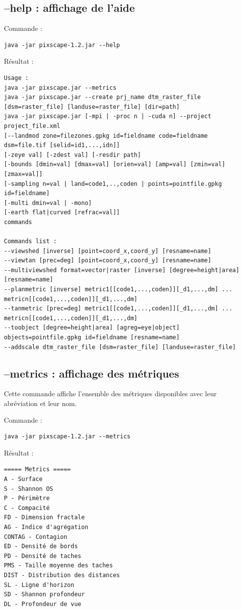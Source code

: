 \documentclass{report}
\begin{document}
\subsection{--help : affichage de l'aide}
Commande :
\begin{Verbatim}
java -jar pixscape-1.2.jar --help
\end{Verbatim}
Résultat :
\begin{Verbatim}
Usage :
java -jar pixscape.jar --metrics
java -jar pixscape.jar --create prj_name dtm_raster_file [dsm=raster_file] [landuse=raster_file] [dir=path]
java -jar pixscape.jar [-mpi | -proc n | -cuda n] --project project_file.xml
[--landmod zone=filezones.gpkg id=fieldname code=fieldname dsm=file.tif [selid=id1,...,idn]]
[-zeye val] [-zdest val] [-resdir path]
[-bounds [dmin=val] [dmax=val] [orien=val] [amp=val] [zmin=val] [zmax=val]]
[-sampling n=val | land=code1,..,coden | points=pointfile.gpkg id=fieldname]
[-multi dmin=val | -mono]
[-earth flat|curved [refrac=val]]
commands

Commands list :
--viewshed [inverse] [point=coord_x,coord_y] [resname=name]
--viewtan [prec=deg] [point=coord_x,coord_y] [resname=name]
--multiviewshed format=vector|raster [inverse] [degree=height|area] [resname=name]
--planmetric [inverse] metric1[[code1,...,coden]][_d1,...,dm] ... metricn[[code1,...,coden]][_d1,...,dm]
--tanmetric [prec=deg] metric1[[code1,...,coden]][_d1,...,dm] ... metricn[[code1,...,coden]][_d1,...,dm]
--toobject [degree=height|area] [agreg=eye|object] objects=pointfile.gpkg id=fieldname [resname=name]
--addscale dtm_raster_file [dsm=raster_file] [landuse=raster_file]
\end{Verbatim}

\subsection{--metrics : affichage des métriques}
Cette commande affiche l'ensemble des métriques disponibles avec leur abréviation et leur nom. 

Commande :
\begin{Verbatim}
java -jar pixscape-1.2.jar --metrics
\end{Verbatim}
Résultat :
\begin{Verbatim}
===== Metrics =====
A - Surface
S - Shannon OS
P - Périmètre
C - Compacité
FD - Dimension fractale
AG - Indice d'agrégation
CONTAG - Contagion
ED - Densité de bords
PD - Densité de taches
PMS - Taille moyenne des taches
DIST - Distribution des distances
SL - Ligne d'horizon
SD - Shannon profondeur
DL - Profondeur de vue
\end{Verbatim}
\end{document}
